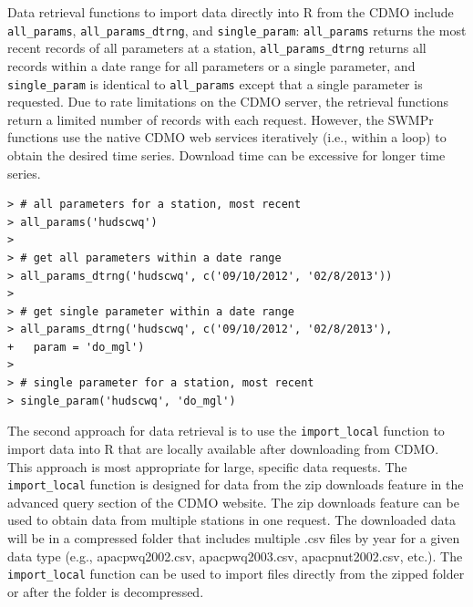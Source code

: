 \documentclass[10pt,letterpaper]{article}\usepackage[]{graphicx}\usepackage[]{color}
\makeatletter
\newenvironment{kframe}{%
 \def\at@end@of@kframe{}%
 \ifinner\ifhmode%
  \def\at@end@of@kframe{\end{minipage}}%
  \begin{minipage}{\columnwidth}%
 \fi\fi%
 \def\FrameCommand##1{\hskip\@totalleftmargin \hskip-\fboxsep
 \colorbox{shadecolor}{##1}\hskip-\fboxsep
     \hskip-\linewidth \hskip-\@totalleftmargin \hskip\columnwidth}%
 \MakeFramed {\advance\hsize-\width
   \@totalleftmargin\z@ \linewidth\hsize
   \@setminipage}}%
 {\par\unskip\endMakeFramed%
 \at@end@of@kframe}
\newenvironment{knitrout}{}{} %
\makeatother
\begin{document}
Data retrieval functions to import data directly into R from the \gls{CDMO} include \texttt{all\_params}, \texttt{all\_params\_dtrng}, and \texttt{single\_param}: \texttt{all\_params} returns the most recent records of all parameters at a station, \texttt{all\_params\_dtrng} returns all records within a date range for all parameters or a single parameter, and \texttt{single\_param} is identical to \texttt{all\_params} except that a single parameter is requested. Due to rate limitations on the \gls{CDMO} server, the retrieval functions return a limited number of records with each request.  However, the SWMPr functions use the native CDMO web services iteratively (i.e., within a loop) to obtain the desired time series.  Download time can be excessive for longer time series.     

\begin{knitrout}\small
{}\color{fgcolor}\begin{kframe}
\begin{verbatim}
> # all parameters for a station, most recent
> all_params('hudscwq')
> 
> # get all parameters within a date range
> all_params_dtrng('hudscwq', c('09/10/2012', '02/8/2013'))
> 
> # get single parameter within a date range
> all_params_dtrng('hudscwq', c('09/10/2012', '02/8/2013'), 
+   param = 'do_mgl')
> 
> # single parameter for a station, most recent
> single_param('hudscwq', 'do_mgl')
\end{verbatim}
\end{kframe}
\end{knitrout}

The second approach for data retrieval is to use the \texttt{import\_local} function to import data into R that are locally available after downloading from \gls{CDMO}.  This approach is most appropriate for large, specific data requests. The \texttt{import\_local} function is designed for data from the zip downloads feature in the advanced query section of the \gls{CDMO} website. The zip downloads feature can be used to obtain data from multiple stations in one request.  The downloaded data will be in a compressed folder that includes multiple .csv files by year for a given data type (e.g., apacpwq2002.csv, apacpwq2003.csv, apacpnut2002.csv, etc.).  The \texttt{import\_local} function can be used to import files directly from the zipped folder or after the folder is decompressed.
\end{document}
